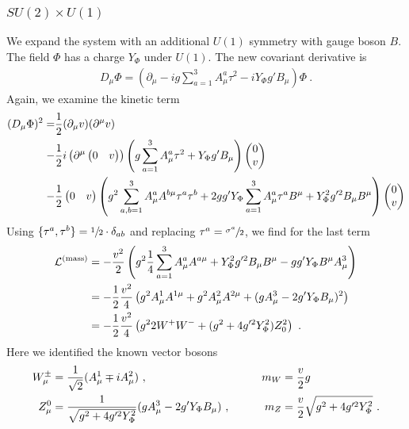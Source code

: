 \subsubsection{$SU(2)\times U(1)$}
We expand the system with an additional $U(1)$ symmetry with gauge boson $B$. The field $\Phi$ has a charge $Y_\Phi$ under $U(1)$. The new covariant derivative is
\begin{align}
	D_\mu\Phi = \left(\partial_\mu - ig\sum_{a=1}^3A_\mu^a\tau^2 - iY_\Phi g'B_\mu\right)\Phi \ .
\end{align}
Again, we examine the kinetic term
\begin{align}
	(D_\mu\Phi)^2 = &\frac{1}{2}(\partial_\mu v)(\partial^\mu v)\notag \\
	- &\frac{1}{2}i\left(\partial^\mu\begin{pmatrix} 0 & v \end{pmatrix}\right) \left(g\sum_{a=1}^3A_\mu^a\tau^2 + Y_\Phi g'B_\mu\right)\begin{pmatrix} 0 \\ v \end{pmatrix}\notag \\
	- &\frac{1}{2}\begin{pmatrix} 0 & v \end{pmatrix}
	\left(g^2\sum_{a,b=1}^3A_\mu^aA^{b\mu}\tau^a\tau^b + 2gg'Y_\Phi\sum_{a=1}^3A_\mu^a\tau^aB^\mu + Y_\Phi^2g'^2B_\mu B^\mu\right)
	\begin{pmatrix} 0 \\ v \end{pmatrix}
\end{align}
Using $\{\tau^a,\tau^b\}=\sfrac{1}{2}\cdot\delta_{ab}$ and replacing $\tau^a=\sfrac{\sigma^a}{2}$, we find for the last term
\begin{align}
	\mathcal{L}^{(\text{mass})} &= - \frac{v^2}{2}\left(g^2\frac{1}{4}\sum_{a=1}^3A_\mu^aA^{a\mu} + Y_\Phi^2g'^2B_\mu B^\mu - gg'Y_\Phi B^\mu A_\mu^3\right)\notag \\
	&= - \frac{1}{2}\frac{v^2}{4}\left(g^2A_\mu^1A^{1\mu} + g^2A_\mu^2A^{2\mu} + (gA_\mu^3 - 2g'Y_\Phi B_\mu)^2\right)\notag \\
	&= - \frac{1}{2}\frac{v^2}{4}\left(g^22W^+W^- + (g^2+4g'^2Y_\Phi^2)Z_0^2\right) \ .
\end{align}
Here we identified the known vector bosons
\begin{align}
	W_\mu^\pm &= \frac{1}{\sqrt{2}}(A_\mu^1\mp iA_\mu^2) \ , &&\quad &m_W &= \frac{v}{2}g \notag \\
	Z_\mu^0 &= \frac{1}{\sqrt{g^2+4g'^2Y_\Phi^2}}(gA_\mu^3 - 2g'Y_\Phi B_\mu) \ , &&\quad &m_Z &= \frac{v}{2}\sqrt{g^2+4g'^2Y_\Phi^2} \ .
\end{align}

